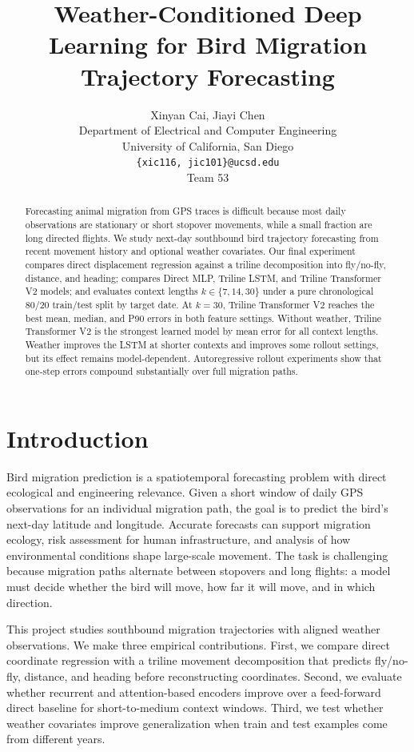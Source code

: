 \documentclass{article}
\title{Weather-Conditioned Deep Learning for Bird Migration Trajectory Forecasting}
\author{
  Xinyan Cai, Jiayi Chen\\
  Department of Electrical and Computer Engineering\\
  University of California, San Diego\\
  \texttt{\{xic116, jic101\}@ucsd.edu}\\
  Team 53
}
\begin{document}
\maketitle

\begin{abstract}
Forecasting animal migration from GPS traces is difficult because most daily observations are stationary or short stopover movements, while a small fraction are long directed flights. We study next-day southbound bird trajectory forecasting from recent movement history and optional weather covariates. Our final experiment compares direct displacement regression against a triline decomposition into fly/no-fly, distance, and heading; compares Direct MLP, Triline LSTM, and Triline Transformer V2 models; and evaluates context lengths $k \in \{7,14,30\}$ under a pure chronological 80/20 train/test split by target date. At $k=30$, Triline Transformer V2 reaches the best mean, median, and P90 errors in both feature settings. Without weather, Triline Transformer V2 is the strongest learned model by mean error for all context lengths. Weather improves the LSTM at shorter contexts and improves some rollout settings, but its effect remains model-dependent. Autoregressive rollout experiments show that one-step errors compound substantially over full migration paths.
\end{abstract}

\section{Introduction}

Bird migration prediction is a spatiotemporal forecasting problem with direct ecological and engineering relevance. Given a short window of daily GPS observations for an individual migration path, the goal is to predict the bird's next-day latitude and longitude. Accurate forecasts can support migration ecology, risk assessment for human infrastructure, and analysis of how environmental conditions shape large-scale movement. The task is challenging because migration paths alternate between stopovers and long flights: a model must decide whether the bird will move, how far it will move, and in which direction.

This project studies southbound migration trajectories with aligned weather observations. We make three empirical contributions. First, we compare direct coordinate regression with a triline movement decomposition that predicts fly/no-fly, distance, and heading before reconstructing coordinates. Second, we evaluate whether recurrent and attention-based encoders improve over a feed-forward direct baseline for short-to-medium context windows. Third, we test whether weather covariates improve generalization when train and test examples come from different years.
\end{document}
